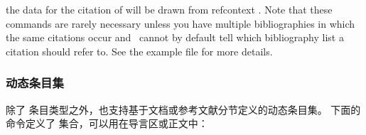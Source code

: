 \begin{ltxexample}[style=latex]{}
\cite{key1}
\begin{refcontext}[labelprefix=B]
\cite{key2}
\end{refcontext}
\end{ltxexample}
%
the data for the citation of  will be drawn from refcontext . Note that these commands are rarely necessary unless you have multiple bibliographies in which the same citations occur and \biblatex\ cannot by default tell which bibliography list a citation should refer to. See the example file  for more details.


\subsubsection{动态条目集}%
\label{use:bib:set}


除了  条目类型之外，\biblatex 也支持基于文档或参考文献分节定义的动态条目集。
下面的命令定义了  集合，可以用在导言区或正文中：

